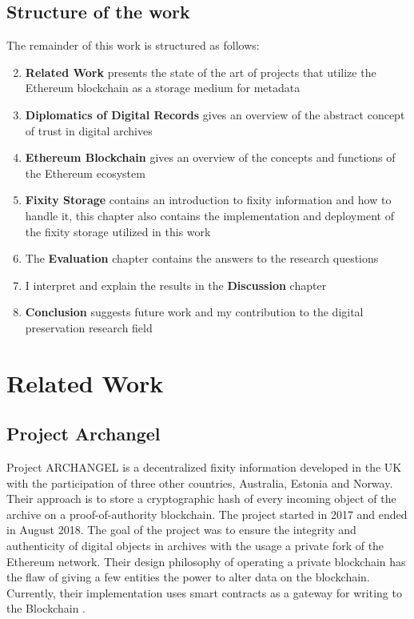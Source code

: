 \documentclass[final]{vutinfth}
\begin{document}
\section{Structure of the work}
The remainder of this work is structured as follows:
\begin{enumerate}[label=\textbf{\arabic*})]
  \setcounter{enumi}{1}
  \item \textbf{Related Work} presents the state of the art of projects that utilize the Ethereum blockchain as a storage medium for metadata
  \item \textbf{Diplomatics of Digital Records} gives an overview of the abstract concept of trust in digital archives
  \item \textbf{Ethereum Blockchain} gives an overview of the concepts and functions of the Ethereum ecosystem
  \item \textbf{Fixity Storage} contains an introduction to fixity information and how to handle it, this chapter also contains the implementation and deployment of the fixity storage utilized in this work
  \item The \textbf{Evaluation} chapter contains the answers to the research questions 
  \item I interpret and explain the results in the \textbf{Discussion} chapter
  \item \textbf{Conclusion} suggests future work and my contribution to the digital preservation research field
\end{enumerate} \chapter{Related Work}
\section{Project Archangel}
Project ARCHANGEL is a decentralized fixity information developed in the UK with the participation of three other countries, Australia, Estonia and Norway. Their approach is to store a cryptographic hash of every incoming object of the archive on a proof-of-authority blockchain. The project started in 2017 and ended in August 2018. The goal of the project was to ensure the integrity and authenticity of digital objects in archives with the usage a private fork of the Ethereum network. Their design philosophy of operating a private blockchain has the flaw of giving a few entities the power to alter data on the blockchain. Currently, their implementation uses smart contracts as a gateway for writing to the Blockchain \cite[4]{collomosse2018archangel}.
\end{document}

